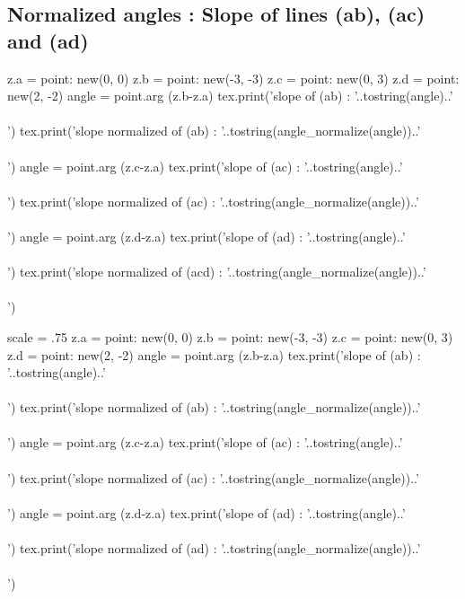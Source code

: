 \subsection{Normalized angles : Slope of lines (ab), (ac) and (ad)} %
\label{sub:normalized_angles}
\begin{tkzexample}[latex=0cm,small,code only]
\begin{tkzelements}
   z.a      = point: new(0, 0)
   z.b      = point: new(-3, -3)
   z.c      = point: new(0, 3)
   z.d      = point: new(2, -2)
   angle    = point.arg (z.b-z.a)
   tex.print('slope of (ab) : '..tostring(angle)..'\\\\')
   tex.print('slope normalized of (ab) : '..tostring(angle\_normalize(angle))..'\\\\')
   angle    = point.arg (z.c-z.a)
   tex.print('slope of (ac) : '..tostring(angle)..'\\\\')
   tex.print('slope normalized of (ac) : '..tostring(angle\_normalize(angle))..'\\\\')
   angle    = point.arg (z.d-z.a)
   tex.print('slope of (ad) : '..tostring(angle)..'\\\\')
   tex.print('slope normalized of (acd) : '..tostring(angle\_normalize(angle))..'\\\\')
\end{tkzelements}
\end{tkzexample}
\begin{tkzelements}
  scale = .75
z.a = point: new(0, 0)
z.b = point: new(-3, -3)
z.c = point: new(0, 3)
z.d = point: new(2, -2)
angle = point.arg (z.b-z.a)
tex.print('slope of (ab) : '..tostring(angle)..'\\\\')
tex.print('slope normalized of (ab) : '..tostring(angle_normalize(angle))..'\\\\')
angle = point.arg (z.c-z.a)
tex.print('slope of (ac) : '..tostring(angle)..'\\\\')
tex.print('slope normalized of (ac) : '..tostring(angle_normalize(angle))..'\\\\')
angle = point.arg (z.d-z.a)
tex.print('slope of (ad) : '..tostring(angle)..'\\\\')
tex.print('slope normalized of (ad) : '..tostring(angle_normalize(angle))..'\\\\')
\end{tkzelements}

